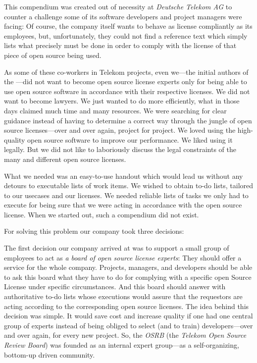 This compendium was created out of necessity at \emph{Deutsche Telekom AG} to
counter a challenge some of its software developers and project managers were
facing: Of course, the company itself wants to behave as license compliantly as
its employees, but, unfortunately, they could not find a reference text which
simply lists what precisely must be done in order to comply with the license of
that piece of open source being used.

As some of these co-workers in Telekom projects, even we---the initial authors
of the \oslic---did not want to become open source license experts only for being
able to use open source software in accordance with their respective licenses. We
did not want to become lawyers. We just wanted to do more efficiently, what
in those days claimed much time and many resources. We were searching for clear
guidance instead of having to determine a correct way through the jungle of open
source licenses---over and over again, project for project. We loved using the
high-quality open source software to improve our performance. We liked using it
legally. But we did not like to laboriously discuss the legal constraints of the
many and different open source licenses.

What we needed was an easy-to-use handout which would lead us without any
detours to executable lists of work items. We wished to obtain to-do lists,
tailored to our usecases and our licenses. We needed reliable lists of tasks we
only had to execute for being sure that we were acting in accordance with the
open source license. When we started out, such a compendium did not exist.

For solving this problem our company took three decisions:

The first decision our company arrived at was to support a small group of
employees to act as \emph{a board of open source license experts}: They should
offer a service for the whole company. Projects, managers, and developers should
be able to ask this board what they have to do for complying with a specific
open Source License under specific circumstances. And this board should answer
with authoritative to-do lists whose executions would assure that the requestors
are acting according to the corresponding open source licenses. The idea behind
this decision was simple. It would save cost and increase quality if one had one
central group of experts instead of being obliged to select (and to train)
developers---over and over again, for every new project. So, the \emph{OSRB} 
(the \emph{Telekom Open Source Review Board}) was founded as an internal expert
group---as a self-organizing, bottom-up driven community.

